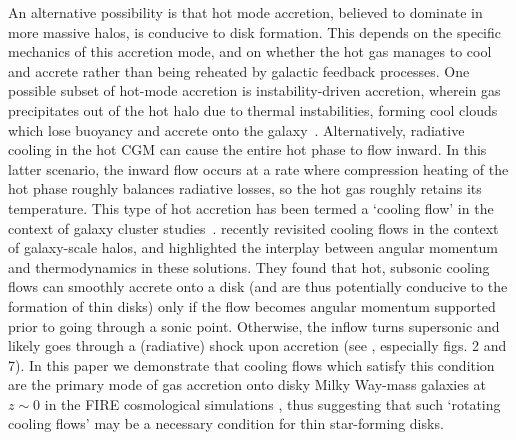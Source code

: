 \documentclass[fleqn,usenatbib]{mnras}
\begin{document}
An alternative possibility is that hot mode accretion, believed to dominate in more massive halos, is conducive to disk formation. This depends on the specific mechanics of this accretion mode, and on whether the hot gas manages to cool and accrete rather than being reheated by galactic feedback processes.
One possible subset of hot-mode accretion is instability-driven accretion, wherein gas precipitates out of the hot halo due to thermal instabilities, forming cool clouds which lose buoyancy and accrete onto the galaxy~\citep[e.g.][]{Maller2004, Mccourt2012, Voit2015, Armillotta2016, Gronke2019a, Voit2021}.
Alternatively, radiative cooling in the hot CGM can cause the entire hot phase to flow inward.
In this latter scenario, the inward flow occurs at a rate where compression heating of the hot phase roughly balances radiative losses, so the hot gas roughly retains its temperature.
This type of hot accretion has been termed a `cooling flow' in the context of galaxy cluster studies~\citep[][see \citealt{McNamara2007} for a review]{Mathews1978, Cowie1980, Fabian1984, Balbus1988, Bertschinger1989}. 
\cite{Stern2019, Stern2020} recently revisited cooling flows in the context of galaxy-scale halos, and highlighted the interplay between angular momentum and thermodynamics in these solutions. They found that hot, subsonic cooling flows can smoothly accrete onto a disk (and are thus potentially conducive to  the formation of thin disks) only if the flow becomes angular momentum supported prior to going through a sonic point. 
Otherwise, the inflow turns supersonic and likely goes through a (radiative) shock upon accretion
(see \citealt{Stern2020}, especially figs. 2 and 7). In this paper we demonstrate that cooling flows which satisfy this condition are the primary mode of gas accretion onto disky Milky Way-mass galaxies at $z \sim 0$ in the FIRE cosmological simulations \citep{Hopkins2018}, thus suggesting that such `rotating cooling flows' may be a necessary condition for thin star-forming disks. 
\end{document}
